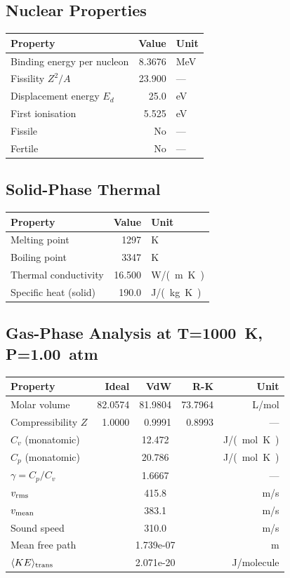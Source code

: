 \documentclass[11pt,a4paper]{article}
\begin{document}
\subsection{Nuclear Properties}
\begin{tabular}{lrl}
  \toprule
  Property & Value & Unit \\
  \midrule
  Binding energy per nucleon & 8.3676 & \si{MeV} \\
  Fissility $Z^2/A$ & 23.900 & --- \\
  Displacement energy $E_d$ & 25.0 & \si{eV} \\
  First ionisation & 5.525 & \si{eV} \\
  Fissile & No & --- \\
  Fertile & No & --- \\
  \bottomrule
\end{tabular}

\subsection{Solid-Phase Thermal}
\begin{tabular}{lrl}
  \toprule
  Property & Value & Unit \\
  \midrule
  Melting point & 1297 & \si{K} \\
  Boiling point & 3347 & \si{K} \\
  Thermal conductivity & 16.500 & \si{W/(m.K)} \\
  Specific heat (solid) & 190.0 & \si{J/(kg.K)} \\
  \bottomrule
\end{tabular}

\subsection{Gas-Phase Analysis at T=\SI{1000}{K}, P=\SI{1.00}{atm}}
\begin{tabular}{lrrrr}
  \toprule
  Property & Ideal & VdW & R-K & Unit \\
  \midrule
  Molar volume & 82.0574 & 81.9804 & 73.7964 & \si{L/mol} \\
  Compressibility $Z$ & 1.0000 & 0.9991 & 0.8993 & --- \\
  \midrule
  $C_v$ (monatomic) & \multicolumn{3}{c}{12.472} & \si{J/(mol.K)} \\
  $C_p$ (monatomic) & \multicolumn{3}{c}{20.786} & \si{J/(mol.K)} \\
  $\gamma = C_p/C_v$ & \multicolumn{3}{c}{1.6667} & --- \\
  $v_{\rm rms}$ & \multicolumn{3}{c}{415.8} & \si{m/s} \\
  $v_{\rm mean}$ & \multicolumn{3}{c}{383.1} & \si{m/s} \\
  Sound speed & \multicolumn{3}{c}{310.0} & \si{m/s} \\
  Mean free path & \multicolumn{3}{c}{1.739e-07} & \si{m} \\
  $\langle KE \rangle_{\rm trans}$ & \multicolumn{3}{c}{2.071e-20} & \si{J/molecule} \\
  \bottomrule
\end{tabular}
\end{document}
